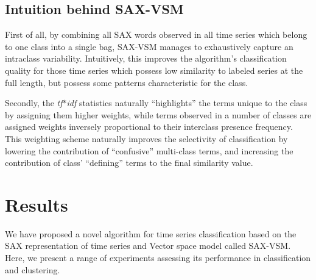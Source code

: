 \documentclass{llncs}
\begin{document}
\subsection{Intuition behind SAX-VSM}
First of all, by combining all SAX words observed in all time series which belong to one class 
into a single bag, SAX-VSM manages to exhaustively capture an intraclass variability. 
Intuitively, this improves the algorithm's classification quality for those time series which 
possess low similarity to labeled series at the full length, but possess some patterns 
characteristic for the class. 

Secondly, the \textit{tf$\ast$idf} statistics naturally ``highlights'' the terms unique to the
class by assigning them higher weights, while terms observed in a number of classes are assigned
weights inversely proportional to their interclass presence frequency. This weighting scheme
naturally improves the selectivity of classification by  lowering the contribution of ``confusive''
multi-class terms, and  increasing  the contribution  of  class' ``defining'' terms to the final
similarity value.   
   
\section{Results}
We have proposed a novel algorithm for time series classification based on the SAX
representation of time series and Vector space model called SAX-VSM. Here, we present a range of
experiments assessing its performance in classification and clustering.
\end{document}
